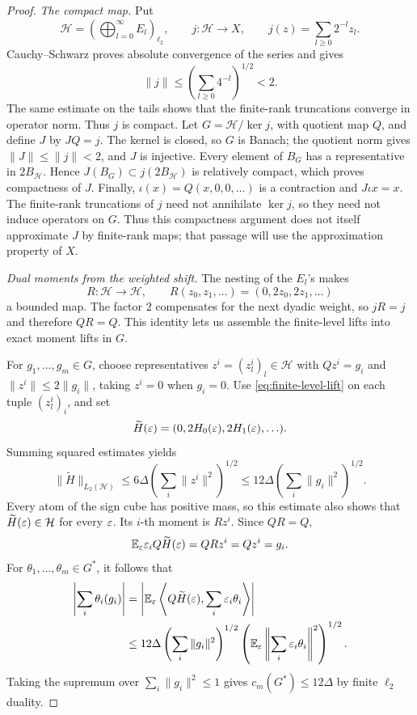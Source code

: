 \begin{proof}
\medskip
\textit{The compact map.}
Put
\[
\mathcal H=\left(\bigoplus_{l=0}^\infty E_l\right)_{\ell_2},
\qquad
j:\mathcal H\to X,\qquad j(z)=\sum_{l\ge0}2^{-l}z_l.
\]
Cauchy--Schwarz proves absolute convergence of the series and gives
\[
\|j\|\le\left(\sum_{l\ge0}4^{-l}\right)^{1/2}<2.
\]
The same estimate on the tails shows that the finite-rank truncations
converge in operator norm. Thus \(j\) is compact.
Let \(G=\mathcal H/\ker j\), with quotient map \(Q\), and define
\(J\) by \(JQ=j\). The kernel is closed, so \(G\) is Banach;
the quotient norm gives \(\|J\|\le\|j\|<2\), and \(J\) is injective.
Every element of \(B_G\) has a representative in \(2B_{\mathcal H}\).
Hence \(J(B_G)\subset j(2B_{\mathcal H})\) is relatively compact,
which proves compactness of \(J\). Finally,
\(\iota(x)=Q(x,0,0,\ldots)\) is a contraction and \(J\iota x=x\).
The finite-rank truncations of \(j\) need not annihilate \(\ker j\),
so they need not induce operators on \(G\). Thus this compactness
argument does not itself approximate \(J\) by finite-rank maps;
that passage will use the approximation property of \(X\).

\medskip
\textit{Dual moments from the weighted shift.}
The nesting of the \(E_l\)'s makes
\[
R:\mathcal H\to\mathcal H,\qquad
R(z_0,z_1,\ldots)=(0,2z_0,2z_1,\ldots)
\]
a bounded map. The factor \(2\) compensates for the next dyadic
weight, so \(jR=j\) and therefore \(QR=Q\).
This identity lets us assemble the finite-level lifts into exact
moment lifts in \(G\).

For \(g_1,\ldots,g_m\in G\), choose representatives
\(z^i=(z_l^i)_l\in\mathcal H\) with
\(Qz^i=g_i\) and \(\|z^i\|\le2\|g_i\|\), taking \(z^i=0\)
when \(g_i=0\).
Use \eqref{eq:finite-level-lift} on each tuple \((z_l^i)_i\),
and set
\[
\widetilde H(\varepsilon)=(0,2H_0(\varepsilon),2H_1(\varepsilon),\ldots).
\]
Summing squared estimates yields
\[
\|\widetilde H\|_{L_2(\mathcal H)}
\le6\Delta\left(\sum_i\|z^i\|^2\right)^{1/2}
\le12\Delta\left(\sum_i\|g_i\|^2\right)^{1/2}.
\]
Every atom of the sign cube has positive mass, so this estimate
also shows that \(\widetilde H(\varepsilon)\in\mathcal H\) for every
\(\varepsilon\). Its \(i\)-th moment is \(Rz^i\). Since \(QR=Q\),
\[
\mathbb E_\varepsilon\varepsilon_iQ\widetilde H(\varepsilon)=QRz^i=Qz^i=g_i.
\]
For \(\theta_1,\ldots,\theta_m\in G^*\), it follows that
\begin{align*}
\left|\sum_i\theta_i(g_i)\right|
&=\left|\mathbb E_\varepsilon
\left\langle Q\widetilde H(\varepsilon),\sum_i\varepsilon_i\theta_i\right\rangle\right|\\
&\le12\Delta
\left(\sum_i\|g_i\|^2\right)^{1/2}
\left(\mathbb E_\varepsilon\left\|\sum_i\varepsilon_i\theta_i\right\|^2\right)^{1/2}.
\end{align*}
Taking the supremum over \(\sum_i\|g_i\|^2\le1\) gives
\(c_m(G^*)\le12\Delta\) by finite \(\ell_2\) duality.
\end{proof}

